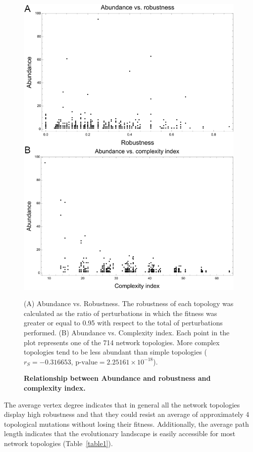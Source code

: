 \documentclass[10pt,letterpaper]{article}
\begin{document}
\begin{figure}[!h]
 \includegraphics[width=\textwidth]{figures/results/Fig6}
 \caption{\bf Relationship between Abundance and robustness and complexity
 index.} (A) Abundance vs. Robustness. The robustness of each topology was
 calculated as the ratio of perturbations in which the fitness was greater or
 equal to 0.95 with respect to the total of perturbations performed.
 (B) Abundance vs. Complexity index. Each point in the plot represents one of
 the 714 network topologies. More complex topologies tend to be less abundant
 than simple topologies
 ($r_S = -0.316653$, $\text{p-value} = 2.25161\times10^{-18}$).
 \label{fig:ab-rob}
\end{figure}

The average vertex degree indicates that in general all the network topologies
display high robustness and that they could resist an average of approximately 4
topological mutations without losing their fitness. Additionally, the average
path length indicates that the evolutionary landscape is easily accessible for
most network topologies (Table~\ref{table1}).
\end{document}
